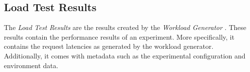 \subsection{Load Test Results}
The \textit{Load Test Results}  are the results created by the \textit{Workload Generator} . These results contain the performance results of an experiment. More specifically, it contains the request latencies as generated by the workload generator. Additionally, it comes with metadata such as the experimental configuration and environment data. 
